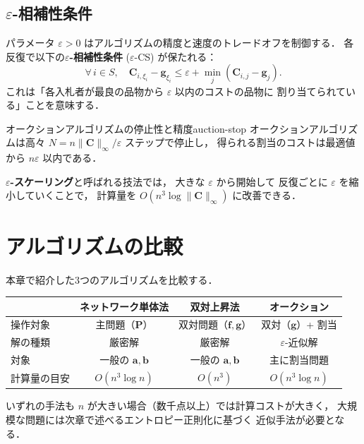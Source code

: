 \subsection{$\varepsilon$-相補性条件}\label{subsec:eps-cs}

パラメータ $\varepsilon > 0$ はアルゴリズムの精度と速度のトレードオフを制御する．
各反復で以下の\textbf{$\varepsilon$-相補性条件} ($\varepsilon$-CS) が保たれる：
\[
  \forall\, i \in S, \quad
  \mathbf{C}_{i,\xi_i} - \mathbf{g}_{\xi_i}
  \leq \varepsilon + \min_{j} (\mathbf{C}_{i,j} - \mathbf{g}_j).
\]
これは「各入札者が最良の品物から $\varepsilon$ 以内のコストの品物に
割り当てられている」ことを意味する．

\begin{proposition}{オークションアルゴリズムの停止性と精度}{auction-stop}
オークションアルゴリズムは高々
$N = n \|\mathbf{C}\|_\infty / \varepsilon$ ステップで停止し，
得られる割当のコストは最適値から $n\varepsilon$ 以内である．
\end{proposition}

$\varepsilon$\textbf{-スケーリング}と呼ばれる技法では，
大きな $\varepsilon$ から開始して
反復ごとに $\varepsilon$ を縮小していくことで，
計算量を $O(n^3 \log \|\mathbf{C}\|_\infty)$ に改善できる．


\section{アルゴリズムの比較}\label{sec:algo-comparison}

本章で紹介した3つのアルゴリズムを比較する．

\medskip
\begin{center}
\begin{tabular}{lccc}
  & ネットワーク単体法 & 双対上昇法 & オークション \\
  \hline
  操作対象 & 主問題（$\mathbf{P}$） & 双対問題（$\mathbf{f}, \mathbf{g}$）
    & 双対（$\mathbf{g}$）+ 割当 \\
  解の種類 & 厳密解 & 厳密解 & $\varepsilon$-近似解 \\
  対象 & 一般の $\mathbf{a}, \mathbf{b}$ &
    一般の $\mathbf{a}, \mathbf{b}$ & 主に割当問題 \\
  計算量の目安 & $O(n^3 \log n)$ & $O(n^3)$ & $O(n^3 \log n)$ \\
  \hline
\end{tabular}
\end{center}
\medskip

いずれの手法も $n$ が大きい場合（数千点以上）では計算コストが大きく，
大規模な問題には次章で述べるエントロピー正則化に基づく
近似手法が必要となる．

